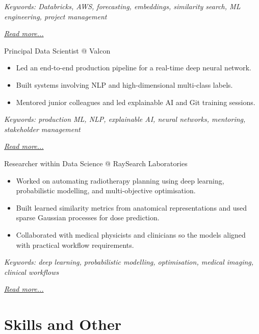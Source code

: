 \documentclass[11pt,a4paper]{moderncv}
\begin{document}
{\footnotesize\textit{Keywords: Databricks, AWS, forecasting, embeddings, similarity search, ML engineering, project management}}

\hfill{\small{\textit{\hyperref[sec:signum]{Read more...}}}}

\large{Principal Data Scientist @ Valcon}
\normalsize
\begin{itemize}
    \item Led an end-to-end production pipeline for a real-time deep neural network.
    \item Built systems involving NLP and high-dimensional multi-class labels.
    \item Mentored junior colleagues and led explainable AI and Git training sessions.
\end{itemize}

{\footnotesize\textit{Keywords: production ML, NLP, explainable AI, neural networks, mentoring, stakeholder management}}

\hfill{\small{\textit{\hyperref[sec:valcon]{Read more...}}}}

\large{Researcher within Data Science @ RaySearch Laboratories}
\normalsize
\begin{itemize}
    \item Worked on automating radiotherapy planning using deep learning, probabilistic modelling, and multi-objective optimisation.
    \item Built learned similarity metrics from anatomical representations and used sparse Gaussian processes for dose prediction.
    \item Collaborated with medical physicists and clinicians so the models aligned with practical workflow requirements.
\end{itemize}

{\footnotesize\textit{Keywords: deep learning, probabilistic modelling, optimisation, medical imaging, clinical workflows}}

\hfill{\small{\textit{\hyperref[sec:raysearch]{Read more...}}}}

\section{Skills and Other}
\normalsize
{}
\end{document}
